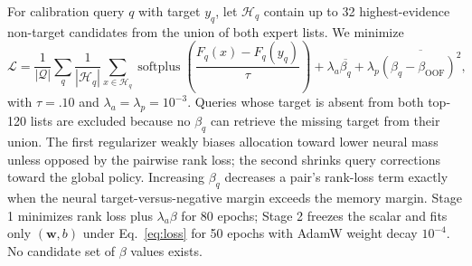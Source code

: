 \documentclass[runningheads]{llncs}
\begin{document}
For calibration query $q$ with target $y_q$, let $\mathcal H_q$ contain up to 32
highest-evidence non-target candidates from the union of both expert lists.
We minimize
\begin{equation}
\mathcal L =
\frac{1}{|\mathcal Q|}\sum_{q}\frac{1}{|\mathcal H_q|}
\sum_{x\in\mathcal H_q}
\operatorname{softplus}\!
\left(\frac{F_q(x)-F_q(y_q)}{\tau}\right)+
\lambda_a\overline{\beta_q}+
\lambda_p\overline{(\beta_q-\beta_{\mathrm{OOF}})^2},
\label{eq:loss}
\end{equation}
with $\tau=.10$ and $\lambda_a=\lambda_p=10^{-3}$. Queries whose target is
absent from both top-120 lists are excluded because no $\beta_q$ can retrieve
the missing target from their union. The first regularizer weakly biases
allocation toward lower neural mass unless opposed by the pairwise rank loss;
the second shrinks query corrections toward the global policy. Increasing
$\beta_q$ decreases a pair's rank-loss term
exactly when the neural target-versus-negative margin exceeds the memory
margin. Stage 1 minimizes rank loss plus $\lambda_a\beta$ for 80 epochs;
Stage 2 freezes the scalar and fits only $(\mathbf w,b)$ under
Eq.~\ref{eq:loss} for 50 epochs with AdamW weight decay $10^{-4}$.
No candidate set of $\beta$ values exists.
\end{document}
